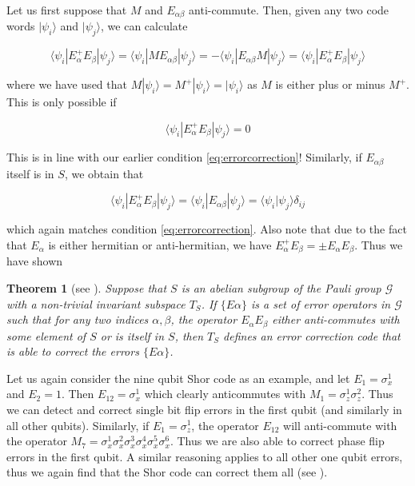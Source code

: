 \documentclass[a4paper, draft]{article}
\theoremstyle{own}
\newtheorem{thm}{Theorem}[section]
\theoremstyle{remark}
\begin{document}
Let us first suppose that $M$ and $E_{\alpha \beta}$ anti-commute. Then, given any two code words $|\psi_i \rangle$ and $|\psi_j \rangle$, we can calculate

$$
\langle \psi_i | E_\alpha^+ E_\beta | \psi_j \rangle =
\langle \psi_i | M E_{\alpha\beta} | \psi_j \rangle =
- \langle \psi_i | E_{\alpha\beta} M | \psi_j \rangle =
\langle \psi_i | E_\alpha^+ E_\beta | \psi_j \rangle
$$

where we have used that $M |\psi_i \rangle = M^+ |\psi_i \rangle = |\psi_i \rangle$ as $M$ is either plus or minus $M^+$. This is only possible if

$$
\langle \psi_i | E_\alpha^+ E_\beta | \psi_j \rangle = 0
$$

This is in line with our earlier condition \eqref{eq:errorcorrection}! Similarly, if $E_{\alpha \beta}$ itself is in $S$, we obtain that

$$
\langle \psi_i | E_\alpha^+ E_\beta | \psi_j \rangle =
\langle \psi_i | E_{\alpha\beta} | \psi_j \rangle =  \langle \psi_i |  \psi_j \rangle
\delta_{ij}
$$

which again matches condition \eqref{eq:errorcorrection}. Also note that due to the fact that $E_\alpha$ is either hermitian or anti-hermitian, we have $E_\alpha^+ E_\beta = \pm E_\alpha E_\beta$. Thus we have shown

\begin{thm}[see \cite{GThesis}]\label{stabilizercondition}
Suppose that $S$ is an abelian subgroup of the Pauli group $\mathcal{G}$ with a non-trivial invariant subspace $T_S$. If $\{E\alpha \}$ is a set of error operators in $\mathcal{G}$ such that for any two indices $\alpha, \beta$, the operator $E_\alpha E_\beta$ either anti-commutes with some element of $S$ or is itself in $S$, then $T_S$ defines an error correction code that is able to correct the errors $\{E\alpha \}$.
\end{thm}
	
Let us again consider the nine qubit Shor code as an example, and let $E_1 = \sigma^1_x$ and $E_2 = 1$. Then $E_{12} = \sigma_x^1$ which clearly anticommutes with $M_1 = \sigma_z^1 \sigma_z^2$. Thus we can detect and correct single bit flip errors in the first qubit (and similarly in all other qubits). Similarly, if $E_1 = \sigma_z^1$, the operator $E_{12}$ will anti-commute with the operator $M_7 = \sigma_x^1 \sigma_x^2 \sigma_x^3 \sigma_x^4 \sigma_x^5 \sigma_x^6$. Thus we are also able to correct phase flip errors in the first qubit. A similar reasoning applies to all other one qubit errors, thus we again find that the Shor code can correct them all (see \cite{GThesis}). 
\end{document}
